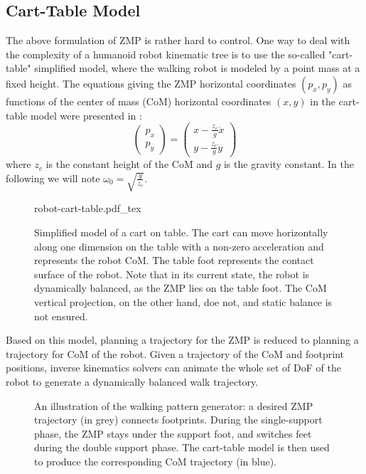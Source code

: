 \subsection{Cart-Table Model}
\label{subsec:chap1-cart-table}

The above formulation of ZMP is rather hard to control.  One way to
deal with the complexity of a humanoid robot kinematic tree is to use
the so-called "cart-table" simplified model, where the walking robot
is modeled by a point mass at a fixed height.  The equations giving
the ZMP horizontal coordinates $(p_x,p_y)$ as functions of the center
of mass (CoM) horizontal coordinates $(x,y)$ in the cart-table model
were presented in \cite{kaji03}:
\begin{equation}
\label{eq:chap1-walk-zmp}
\left(
\begin{array}{c}
p_x\\ p_y
\end{array}
\right) = \displaystyle \left(
\begin{array}{c}
x - \frac{z_c}{g} \ddot{x}\\ y - \frac{z_c}{g} \ddot{y}
\end{array}
\right)
\end{equation}
where $z_c$ is the constant height of the CoM and $g$ is the gravity
constant.  In the following we will note $\omega_0
=\sqrt{\frac{g}{z_c}}$.

\begin{figure}
  \centering
      {\def\svgwidth{0.5\linewidth}
        
                   {robot-cart-table.pdf_tex}}
      \caption{Simplified model of a cart on table. The cart can move
        horizontally along one dimension on the table with a non-zero
        acceleration and represents the robot CoM. The table foot
        represents the contact surface of the robot. Note that in its
        current state, the robot is dynamically balanced, as the ZMP
        lies on the table foot. The CoM vertical projection, on the
        other hand, doe not, and static balance is not ensured.}
      \label{fig:chap1-robot-cart-table}
\end{figure}

Based on this model, planning a trajectory for the ZMP is reduced to
planning a trajectory for CoM of the robot. Given a trajectory of the
CoM and footprint positions, inverse kinematics solvers can animate
the whole set of DoF of the robot to generate a dynamically balanced
walk trajectory.

\begin{figure}
  \centering
  
  \caption{An illustration of the walking pattern generator: a desired
    ZMP trajectory (in grey) connects footprints. During the
    single-support phase, the ZMP stays under the support foot, and
    switches feet during the double support phase. The cart-table
    model is then used to produce the corresponding CoM trajectory (in
    blue).}
  \label{fig:chap1-zmp}
\end{figure}

